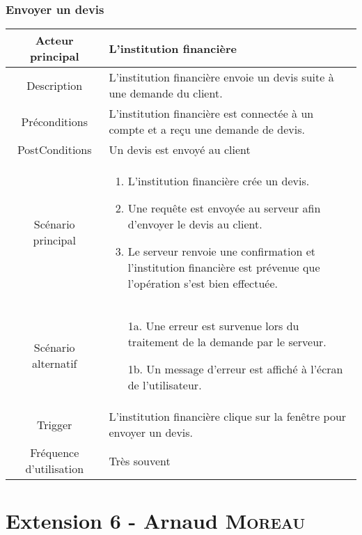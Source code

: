 \documentclass{article}
\begin{document}
\subsubsection{Envoyer un devis}
\begin{table}[h]
    \begin{tabular}{|c|p{10cm}|}
       \hline
       Acteur principal&L'institution financière\\
       \hline
       Description&L'institution financière envoie un devis suite à une demande du client.\\
       \hline
       Préconditions&L'institution financière est connectée à un compte et a reçu une demande de devis.\\
       \hline
       PostConditions&Un devis est envoyé au client\\
       \hline
       Scénario principal& 
             \begin{enumerate}
                \item L'institution financière crée un devis.
                \item Une requête est envoyée au serveur afin d'envoyer le devis au client.
                \item Le serveur renvoie une confirmation et l'institution financière est prévenue que l'opération s'est bien effectuée.
             \end{enumerate}     \\
       \hline
       Scénario alternatif&    
       \begin{itemize}
        \item[1a.] Une erreur est survenue lors du traitement de la demande par le serveur.
        \item[1b.] Un message d'erreur est affiché à l'écran de l'utilisateur. 
        \end{itemize}
       \\
       \hline
       Trigger&L'institution financière clique sur la fenêtre pour envoyer un devis.\\
       \hline
       Fréquence d'utilisation&Très souvent\\
       \hline
    \end{tabular}
 \end{table}


\newpage


\section{Extension 6 - Arnaud \textsc{Moreau}}
\end{document}
